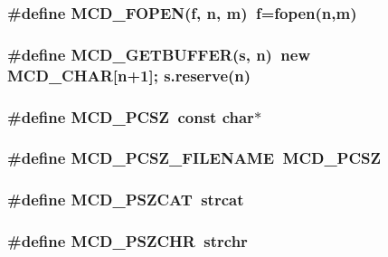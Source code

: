 \subsubsection[MCD\_\-FOPEN]{\setlength{\rightskip}{0pt plus 5cm}\#define MCD\_\-FOPEN(f, \/  n, \/  m)~f=fopen(n,m)}\label{Markup_8h_f539ef4d57b2dc09eae1ff35115d30b3}


\subsubsection[MCD\_\-GETBUFFER]{\setlength{\rightskip}{0pt plus 5cm}\#define MCD\_\-GETBUFFER(s, \/  n)~new MCD\_\-CHAR[n+1]; s.reserve(n)}\label{Markup_8h_8bec93c42fdcd4f51326f897d2185aa8}


\subsubsection[MCD\_\-PCSZ]{\setlength{\rightskip}{0pt plus 5cm}\#define MCD\_\-PCSZ~const char$\ast$}\label{Markup_8h_edde484976c7ebb2e31d6be23e669128}


\subsubsection[MCD\_\-PCSZ\_\-FILENAME]{\setlength{\rightskip}{0pt plus 5cm}\#define MCD\_\-PCSZ\_\-FILENAME~MCD\_\-PCSZ}\label{Markup_8h_7dbef2772d51e540f1dfc521c1fa5866}


\subsubsection[MCD\_\-PSZCAT]{\setlength{\rightskip}{0pt plus 5cm}\#define MCD\_\-PSZCAT~strcat}\label{Markup_8h_1f111b6472a97a8308f47a42a5ca02c0}


\subsubsection[MCD\_\-PSZCHR]{\setlength{\rightskip}{0pt plus 5cm}\#define MCD\_\-PSZCHR~strchr}\label{Markup_8h_0b4f312ed85cdcdafc5ed8c88da98ce9}




